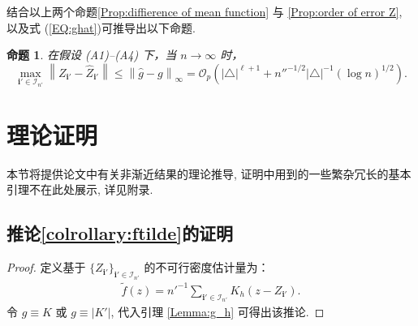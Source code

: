 \documentclass[a4paper,openay,14pt]{ctexbook}
\numberwithin{equation}{section}
\numberwithin{lem}{section}
\newtheorem{pro}[theorem]{命题}
\begin{document}
结合以上两个命题\ref{Prop:diffierence of mean function} 与 \ref{Prop:order of error Z}, 以及式 (\ref{EQ:ghat})可推导出以下命题.

\begin{pro} \label{Prop:order of Z-Zhat}
在假设 (A1)–(A4) 下，当 $n \to \infty$ 时，
\[
\max_{\mathbf{i}' \in \mathcal{I}_{n'}}
\left\lVert Z_{\mathbf{i}'} - \hat{Z}_{\mathbf{i}'} \right\rVert
\le \left\lVert \hat{g} - g \right\rVert_{\infty}
= \mathcal{O}_p \left( |\triangle|^{\ell+1}
+ n''^{-1/2} |\triangle|^{-1} (\log n)^{1/2} \right).
\]
\end{pro}


\section{理论证明}
本节将提供论文中有关非渐近结果的理论推导,  证明中用到的一些繁杂冗长的基本引理不在此处展示,  详见附录. 
\subsection{推论\ref{colrollary:ftilde}的证明}
\begin{proof}
    定义基于 $\{ Z_{\mathbf{i}'} \}_{\mathbf{i}'\in\mathcal{I}_{n'}}$ 的不可行密度估计量为：
\begin{align}\label{DEF:ftilde}
    \tilde{f}(z) = n'^{-1} \sum_{\mathbf{i}'\in\mathcal{I}_{n'}}K_h(z-Z_{\mathbf{i}'}).
\end{align}
 令 $g \equiv K$ 或 $g \equiv |K'|$, 代入引理 \ref{Lemma:g_h} 可得出该推论.
\end{proof}
\end{document}
